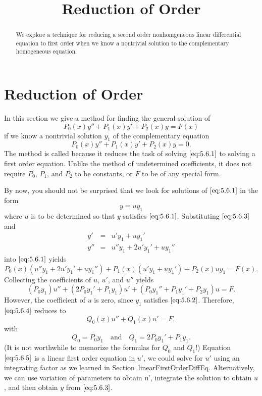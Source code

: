 \documentclass{ximera}
\title{Reduction of Order}
\begin{document}
 
\begin{abstract}
 We explore a technique for reducing a second order nonhomgeneous linear differential equation to first order when we know a nontrivial solution to the complementary homogeneous equation.
\end{abstract}
 
\maketitle
 
\section*{Reduction of Order}
 
In this section we give a method for finding the general
solution of
\begin{equation} \label{eq:5.6.1}
P_0(x)y''+P_1(x)y'+P_2(x)y=F(x)
\end{equation}
if we know  a nontrivial solution $y_1$ of the complementary equation
\begin{equation} \label{eq:5.6.2}
P_0(x)y''+P_1(x)y'+P_2(x)y=0.
\end{equation}
The method is called  because it reduces
the task of solving $\eqref{eq:5.6.1}$ to solving a first order equation.
Unlike the method of undetermined coefficients, it does not require
$P_0$, $P_1$, and $P_2$ to be constants, or $F$ to be of any special form.
 
By now, you should not be surprised that we look for
solutions of $\eqref{eq:5.6.1}$ in the form
\begin{equation} \label{eq:5.6.3}
y=uy_1
\end{equation}
where $u$ is to be determined so that $y$ satisfies $\eqref{eq:5.6.1}$.
Substituting $\eqref{eq:5.6.3}$ and
$$\begin{array}{rcl}
y'&=& u'y_1+uy_1' \\
y''&=& u''y_1+2u'y_1'+uy_1''
\end{array}$$
into $\eqref{eq:5.6.1}$ yields
$$
P_0(x)(u''y_1+2u'y_1'+uy_1'')+P_1(x)(u'y_1+uy_1')+P_2(x)uy_1=F(x).
$$
Collecting the coefficients of $u$, $u'$, and $u''$ yields
\begin{equation} \label{eq:5.6.4}
(P_0y_1)u''+(2P_0y_1'+P_1y_1)u'+(P_0y_1''+P_1y_1'+P_2y_1)
u=F.
\end{equation}
However, the coefficient of $u$ is zero, since $y_1$ satisfies
$\eqref{eq:5.6.2}$. Therefore, $\eqref{eq:5.6.4}$ reduces to
\begin{equation} \label{eq:5.6.5}
Q_0(x)u''+Q_1(x)u'=F,
\end{equation}
with
$$
Q_0=P_0y_1 \quad\mbox{and}\quad Q_1=2P_0y_1'+P_1y_1.
$$
(It is not worthwhile to memorize the formulas for $Q_0$ and $Q_1$!)
Equation $\eqref{eq:5.6.5}$ is a linear first order equation in $u'$, we could solve for $u'$ using an integrating factor as we learned in Section~\href{https://ximera.osu.edu/ode/main/linearFirstOrderDiffEq/linearFirstOrderDiffEq}{linearFirstOrderDiffEq}.  Alternatively, we can use variation of parameters to obtain u', integrate the solution to obtain $u$, and then
obtain $y$ from $\eqref{eq:5.6.3}$.
 
\end{document}
